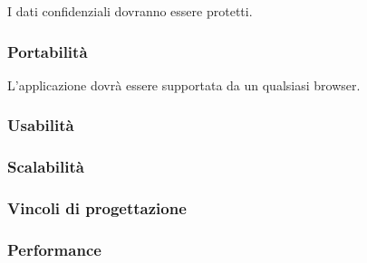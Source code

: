 \documentclass[12pt]{article}
\begin{document}
I dati confidenziali dovranno essere protetti.

\subsubsection{Portabilità}

L'applicazione dovrà essere supportata da un qualsiasi browser.

\subsubsection{Usabilità}
\subsubsection{Scalabilità}
\subsubsection{Vincoli di progettazione}
\subsubsection{Performance}


 
\end{document}
